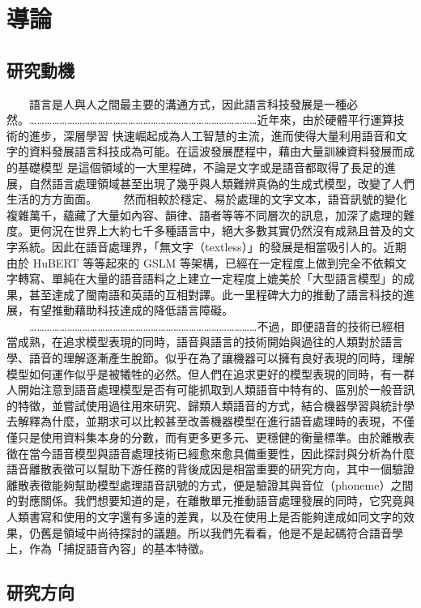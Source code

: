 
\chapter{導論}

\section{研究動機}

　　語言是人與人之間最主要的溝通方式，因此語言科技發展是一種必然。………………………………………………………………………………近年來，由於硬體平行運算技術的進步，深層學習 快速崛起成為人工智慧的主流，進而使得大量利用語音和文字的資料發展語言科技成為可能。在這波發展歷程中，藉由大量訓練資料發展而成的基礎模型 是這個領域的一大里程碑，不論是文字或是語音都取得了長足的進展，自然語言處理領域甚至出現了幾乎與人類難辨真偽的生成式模型，改變了人們生活的方方面面。
　　然而相較於穩定、易於處理的文字文本，語音訊號的變化複雜萬千，蘊藏了大量如內容、韻律、語者等等不同層次的訊息，加深了處理的難度。更何況在世界上大約七千多種語言中，絕大多數其實仍然沒有成熟且普及的文字系統。因此在語音處理界，「無文字（textless）」的發展是相當吸引人的。近期由於 HuBERT 等等起來的 GSLM 等架構，已經在一定程度上做到完全不依賴文字轉寫、單純在大量的語音語料之上建立一定程度上媲美於「大型語言模型」的成果，甚至達成了閩南語和英語的互相對譯。此一里程碑大力的推動了語言科技的進展，有望推動藉助科技達成的降低語言障礙。
　　………………………………………………………………………………不過，即便語音的技術已經相當成熟，在追求模型表現的同時，語音與語言的技術開始與過往的人類對於語言學、語音的理解逐漸產生脫節。似乎在為了讓機器可以擁有良好表現的同時，理解模型如何運作似乎是被犧牲的必然。但人們在追求更好的模型表現的同時，有一群人開始注意到語音處理模型是否有可能抓取到人類語音中特有的、區別於一般音訊的特徵，並嘗試使用過往用來研究、歸類人類語音的方式，結合機器學習與統計學去解釋為什麼，並期求可以比較甚至改善機器模型在進行語音處理時的表現，不僅僅只是使用資料集本身的分數，而有更多更多元、更穩健的衡量標準。由於離散表徵在當今語音模型與語音處理技術已經愈來愈具備重要性，因此探討與分析為什麼語音離散表徵可以幫助下游任務的背後成因是相當重要的研究方向，其中一個驗證離散表徵能夠幫助模型處理語音訊號的方式，便是驗證其與音位（phoneme）之間的對應關係。我們想要知道的是，在離散單元推動語音處理發展的同時，它究竟與人類書寫和使用的文字還有多遠的差異，以及在使用上是否能夠達成如同文字的效果，仍舊是領域中尚待探討的議題。所以我們先看看，他是不是起碼符合語音學上，作為「捕捉語音內容」的基本特徵。



\section{研究方向}
　　

